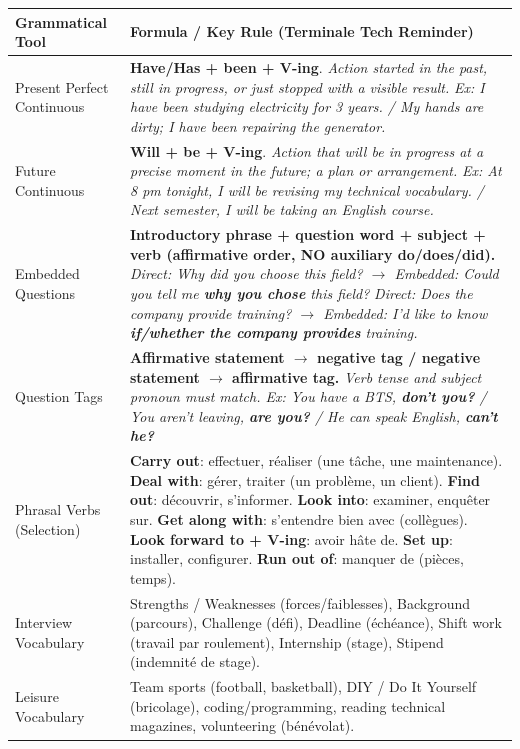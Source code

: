 \documentclass[11pt]{article}
\newcommand{\cle}[1]{{\popxbold\color{popdark}#1}}
\newcounter{popsec}
\newcounter{popsub}
\newcommand{\courssub}[1]{%
  \stepcounter{popsub}%
  \par\vspace{9pt}\noindent{\popxbold\fontsize{11.5}{13}\selectfont\color{popink}{\color{poporange}\thepopsec.\thepopsub}\hspace{6pt}#1}\par\nopagebreak\vspace{4pt}
}
\begin{document}
\courssub{Ressources à mobiliser}
\begin{center}
\begin{tabularx}{\linewidth}{|l|X|}\hline
\rowcolor{popblueL}
\textbf{Grammatical Tool} & \textbf{Formula / Key Rule (Terminale Tech Reminder)} \\ \hline
\cle{Present Perfect Continuous} & \textbf{Have/Has + been + V-ing}. \emph{Action started in the past, still in progress, or just stopped with a visible result.} \textit{Ex: I have been studying electricity for 3 years. / My hands are dirty; I have been repairing the generator.} \\ \hline
\cle{Future Continuous} & \textbf{Will + be + V-ing}. \emph{Action that will be in progress at a precise moment in the future; a plan or arrangement.} \textit{Ex: At 8 pm tonight, I will be revising my technical vocabulary. / Next semester, I will be taking an English course.} \\ \hline
\cle{Embedded Questions} & \textbf{Introductory phrase + question word + subject + verb (affirmative order, NO auxiliary do/does/did).} \textit{Direct: Why did you choose this field? $\rightarrow$ Embedded: Could you tell me \textbf{why you chose} this field?} \textit{Direct: Does the company provide training? $\rightarrow$ Embedded: I'd like to know \textbf{if/whether the company provides} training.} \\ \hline
\cle{Question Tags} & \textbf{Affirmative statement $\rightarrow$ negative tag / negative statement $\rightarrow$ affirmative tag.} \textit{Verb tense and subject pronoun must match. Ex: You have a BTS, \textbf{don't you?} / You aren't leaving, \textbf{are you?} / He can speak English, \textbf{can't he?}} \\ \hline
\cle{Phrasal Verbs (Selection)} & \textbf{Carry out}: effectuer, réaliser (une tâche, une maintenance). \textbf{Deal with}: gérer, traiter (un problème, un client). \textbf{Find out}: découvrir, s'informer. \textbf{Look into}: examiner, enquêter sur. \textbf{Get along with}: s'entendre bien avec (collègues). \textbf{Look forward to + V-ing}: avoir hâte de. \textbf{Set up}: installer, configurer. \textbf{Run out of}: manquer de (pièces, temps). \\ \hline
\cle{Interview Vocabulary} & \cle{Strengths / Weaknesses} (forces/faiblesses), \cle{Background} (parcours), \cle{Challenge} (défi), \cle{Deadline} (échéance), \cle{Shift work} (travail par roulement), \cle{Internship} (stage), \cle{Stipend} (indemnité de stage). \\ \hline
\cle{Leisure Vocabulary} & \cle{Team sports} (football, basketball), \cle{DIY / Do It Yourself} (bricolage), \cle{coding/programming}, \cle{reading technical magazines}, \cle{volunteering} (bénévolat). \\ \hline
\end{tabularx}
\end{center}
\end{document}
